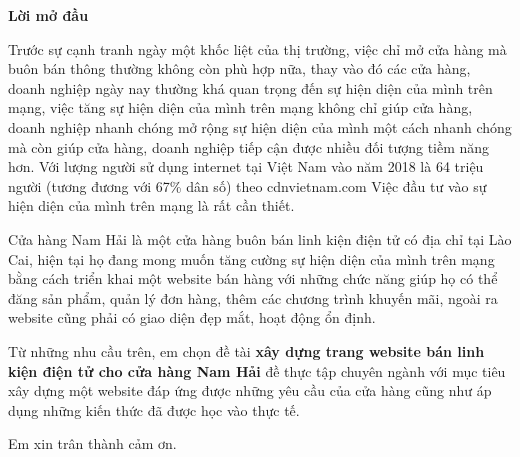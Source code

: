 \begin{center}
    \textbf{Lời mở đầu}
\end{center}

Trước sự cạnh tranh ngày một khốc liệt của thị trường, việc chỉ mở cửa hàng mà buôn bán thông thường không còn phù hợp nữa, thay vào đó các cửa hàng, doanh nghiệp ngày nay thường khá quan trọng đến sự hiện diện của mình trên mạng, việc tăng sự hiện diện của mình trên mạng không chỉ giúp cửa hàng, doanh nghiệp nhanh chóng mở rộng sự hiện diện của mình một cách nhanh chóng mà còn giúp cửa hàng, doanh nghiệp tiếp cận được nhiều đối tượng tiềm năng hơn. Với lượng người sử dụng internet tại Việt Nam vào năm 2018 là 64 triệu người (tương đương với 67\% dân số) theo cdnvietnam.com Việc đầu tư vào sự hiện diện của mình trên mạng là rất cần thiết.
    
Cửa hàng Nam Hải là một cửa hàng buôn bán linh kiện điện tử có địa chỉ tại Lào Cai, hiện tại họ đang mong muốn tăng cường sự hiện diện của mình trên mạng bằng cách triển khai một website bán hàng với những chức năng giúp họ có thể đăng sản phẩm, quản lý đơn hàng, thêm các chương trình khuyến mãi, ngoài ra website cũng phải có giao diện đẹp mắt, hoạt động ổn định.

Từ những nhu cầu trên, em chọn đề tài \textbf{xây dựng trang website bán linh kiện điện tử cho cửa hàng Nam Hải} đề thực tập chuyên ngành với mục tiêu xây dựng một website đáp ứng được những yêu cầu của cửa hàng cũng như áp dụng những kiến thức đã được học vào thực tế.
    
Em xin trân thành cảm ơn.
